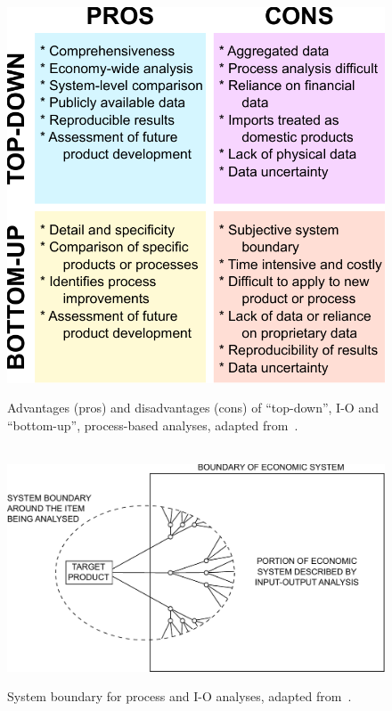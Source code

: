 \begin{figure}[h!]
\centering\
\includegraphics[width=0.8\linewidth]{Part_3/Chapter_Unfinished/images/Top_down_vs_bottom_up.pdf}
\caption[Top-down vs.\ bottom-up analyses ]{Advantages (pros) and disadvantages (cons) of ``top-down'', I-O and ``bottom-up'', process-based analyses, adapted from~\cite{Hendrickson2006}.}
\label{fig:IO_vs_process}
\end{figure}

\begin{figure}[h!]
\centering\
\includegraphics[width=\linewidth]{Part_3/Chapter_Unfinished/images/Hybrid_boundary.pdf}
\caption[System boundary for process and I-O analyses]{System boundary for process and I-O analyses, adapted from~\cite{Bullard:1978vd}.}
\label{fig:Hybrid_boundary}
\end{figure}


